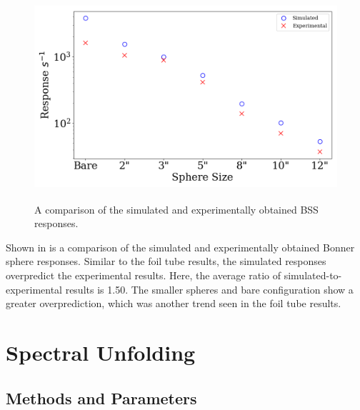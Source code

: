 \begin{figure}[htb]
\centering
\includegraphics[height=3in]{tex/figures/compare_countrates.png}
\caption[BSS Responses]{A comparison of the simulated and experimentally obtained BSS responses.}
\label{fig:compare_countrates}
\end{figure}

Shown in  is a comparison of the simulated and experimentally obtained Bonner sphere responses.
Similar to the foil tube results, the simulated responses overpredict the experimental results.
Here, the average ratio of simulated-to-experimental results is 1.50.
The smaller spheres and bare configuration show a greater overprediction, which was another trend seen in the foil tube results.


\section{Spectral Unfolding}

\subsection{Methods and Parameters}

